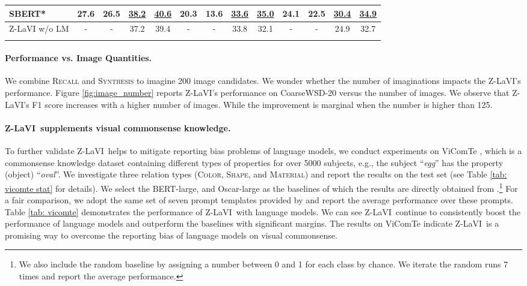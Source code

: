\documentclass[11pt]{article}
\newcommand{\model}{Z-LaVI}
\begin{document}
\begin{table*}[!t]
{\begin{tabular}{lcccc|cccc|cccc}
SBERT* & 27.6 & 26.5 & \underline{38.2} & \underline{40.6} & 20.3 & 13.6 & \underline{33.6} & \underline{35.0} & 24.1 & 22.5 & \underline{30.4} & \underline{34.9}\\ \hline
Z-LaVI w/o LM & - & - & 37.2 & 39.4 & - & - & 33.8 & 32.1 & - & - & 24.9 & 32.7 \\ \Xhline{3\arrayrulewidth}
\end{tabular}
}
\caption{Zero-shot probing on the three relation types (\textsc{Color}, \textsc{Shape} and \textsc{Material}) in ViComTe \cite{zhang-etal-2022-visual} dataset. We report the average Spearman correlation ($\rho$) and top-1 accuracy (Acc@1).}
\label{tab: vicomte}
\end{table*} 
\paragraph{Performance vs. Image Quantities.} We combine \textsc{Recall} and \textsc{Synthesis} to imagine 200 image candidates. We wonder whether the number of imaginations impacts the \model's performance. Figure \ref{fig:image_number}
 reports \model's performance on CoarseWSD-20 versus the number of images. We observe that \model’s F1 score increases with a higher number of images. While the improvement is marginal when the number is higher than 125.


\paragraph{\model~supplements visual commonsense knowledge.} To further validate \model~helps to mitigate reporting bias problems of language models, we conduct experiments on ViComTe \cite{zhang-etal-2022-visual}, which is a commonsense knowledge dataset containing different types of properties for over 5000 subjects, e.g., the subject ``\textit{egg}'' has the property (object) ``\textit{oval}''. We investigate three relation types (\textsc{Color}, \textsc{Shape}, and \textsc{Material}) and report the results on the test set (see Table \ref{tab: vicomte stat} for details). We select the BERT-large, and Oscar-large \cite{li2020oscar} as the baselines of which the results are directly obtained from \citet{zhang-etal-2022-visual}.\footnote{We also include the random baseline by assigning a number between 0 and 1 for each class by chance. We iterate the random runs 7 times and report the average performance.} For a fair comparison, we adopt the same set of seven prompt templates provided by \citet{zhang-etal-2022-visual} and report the average performance over these prompts. Table \ref{tab: vicomte} demonstrates the performance of \model~with language models. We can see \model~continue to consistently boost the performance of language models and outperform the baselines with significant margins. The results on ViComTe indicate \model~is a promising way to overcome the reporting bias of language models on visual commonsense. 
\end{document}
